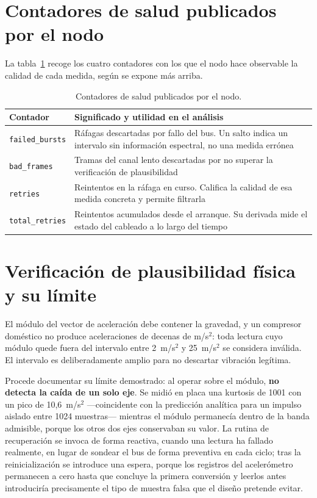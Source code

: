 \section{Contadores de salud publicados por el nodo}

La tabla~\ref{table:contadores} recoge los cuatro contadores con los que el nodo hace observable
la calidad de cada medida, según se expone más arriba.

\begin{table}[ht!]
\caption{Contadores de salud publicados por el nodo.}
\label{table:contadores}
\centering
\begin{tabular}{|p{3.1cm}|p{9.4cm}|}
\hline
\textbf{Contador} & \textbf{Significado y utilidad en el análisis} \\
\hline
\texttt{failed\_bursts} & Ráfagas descartadas por fallo del bus. Un salto indica un
intervalo sin información espectral, no una medida errónea \\
\hline
\texttt{bad\_frames} & Tramas del canal lento descartadas por no superar la verificación de
plausibilidad \\
\hline
\texttt{retries} & Reintentos en la ráfaga en curso. Califica la calidad de esa medida
concreta y permite filtrarla \\
\hline
\texttt{total\_retries} & Reintentos acumulados desde el arranque. Su derivada mide el
estado del cableado a lo largo del tiempo \\
\hline
\end{tabular}
\end{table}

\section{Verificación de plausibilidad física y su límite}

El módulo del vector de aceleración debe contener la gravedad, y un compresor doméstico no produce
aceleraciones de decenas de \mbox{m/s$^2$}: toda lectura cuyo módulo quede fuera del intervalo
entre \mbox{2 m/s$^2$} y \mbox{25 m/s$^2$} se considera inválida. El intervalo es deliberadamente
amplio para no descartar vibración legítima.

Procede documentar su límite demostrado: al operar sobre el módulo, \textbf{no detecta la caída de
un solo eje}. Se midió en placa una kurtosis de 1001 con un pico de \mbox{10,6 m/s$^2$}
—coincidente con la predicción analítica para un impulso aislado entre 1024 muestras— mientras el
módulo permanecía dentro de la banda admisible, porque los otros dos ejes conservaban su valor. La
rutina de recuperación se invoca de forma reactiva, cuando una lectura ha fallado realmente, en
lugar de sondear el bus de forma preventiva en cada ciclo; tras la reinicialización se introduce
una espera, porque los registros del acelerómetro permanecen a cero hasta que concluye la primera
conversión y leerlos antes introduciría precisamente el tipo de muestra falsa que el diseño
pretende evitar.

